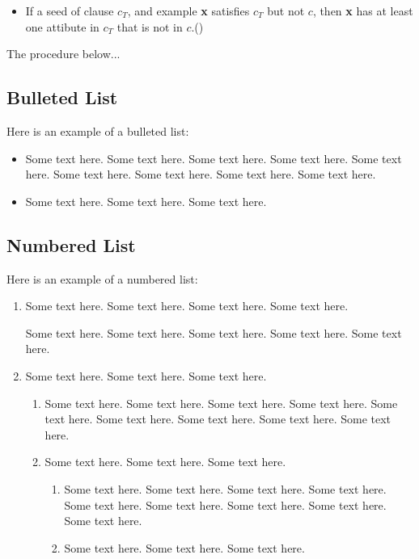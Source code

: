 \begin{article}
\begin{itemize}
\item[] 
If a seed of clause $c_T$, and example {\bf x} satisfies $c_T$ but
not $c$, then {\bf x} has at least one attibute in $c_T$ that
is not in $c$.\hfill({\tt*})
\end{itemize}
The procedure below...

\subsection{Bulleted List}
Here is an example of a bulleted list:
\begin{itemize}
\item
Some text here. Some text here. Some text here. Some text here. Some text here.
Some text here. Some text here. Some text here. Some text here.

\item
Some text here. Some text here. Some text here.
\end{itemize}

\newpage
\subsection{Numbered List}
Here is an example of a numbered list:
\begin{enumerate}
\item
Some text here. Some text here. Some text here. Some text here.

Some text here. Some text here. Some text here. Some text here. Some text here.

\item
Some text here. Some text here. Some text here.
\begin{enumerate}
\item
Some text here. Some text here. Some text here. Some text here. Some text here.
Some text here. Some text here. Some text here. Some text here.

\item
Some text here. Some text here. Some text here.
\begin{enumerate}
\item
Some text here. Some text here. Some text here. Some text here. Some text here.
Some text here. Some text here. Some text here. Some text here.

\item
Some text here. Some text here. Some text here.
\end{enumerate}
\end{enumerate}
\end{enumerate}



\end{article}
